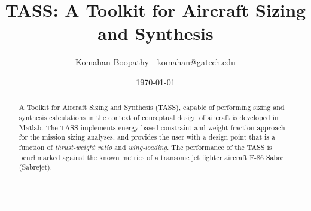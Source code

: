 \documentclass[pdftex,11pt,letter]{article}
\title{\textbf{\textsc{TASS}: A Toolkit for Aircraft Sizing and Synthesis}}
\author{Komahan Boopathy~~\url{komahan@gatech.edu}} \date{\today}
\begin{document}

\clearpage
\tableofcontents
\clearpage
\listoffigures
\listoftables

\maketitle
\vspace{-0.25in}
\rule{\linewidth}{2pt}

\begin{abstract}
A  \ul{T}oolkit for \ul{A}ircraft \ul{S}izing and \ul{S}ynthesis (TASS), capable of performing sizing and synthesis calculations  in the context of conceptual design of aircraft is developed in Matlab\cite{MATLAB}. The TASS implements energy-based constraint and weight-fraction approach for the mission sizing analyses, and provides the user with a design point that is a function of \emph{thrust-weight ratio} and \emph{wing-loading}.  The performance of the TASS is benchmarked against the known metrics of a transonic jet fighter aircraft F-86 Sabre (Sabrejet).
\end{abstract}
\end{document}
